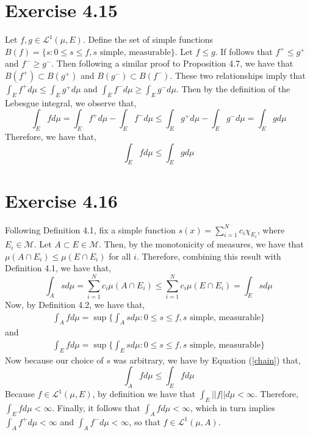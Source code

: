 \documentclass{article}
\begin{document}
  \section*{Exercise 4.15}
  Let $f,g \in \mathscr{L}^1(\mu,E)$. Define the set of simple functions $B(f) = \{ s : 0 \leq s \leq f, s \text{ simple, measurable}  \}$. Let $f \leq g$. If follows that $f^+ \leq g^+$ and $f^- \geq g^-$. Then following a similar proof to Proposition 4.7, we have that $B(f^+) \subset B(g^+)$ and $B(g^-) \subset B(f^-)$.
  These two relationships imply that $ \int_E f^+ d\mu \leq \int_E g^+ d\mu$ and $\int_E f^- d\mu \geq \int_E g^- d\mu$. Then by the definition of the Lebesgue integral, we observe that,
  \begin{equation}
  	\int_E fd\mu = \int_E f^+ d\mu - \int_E f^- d\mu \leq \int_E g^+ d\mu - \int_E g^- d\mu = \int_E g d\mu
  \end{equation}
  Therefore, we have that,
  \begin{equation}
  	\int_E fd\mu \leq \int_E g d\mu
  \end{equation}



  \section*{Exercise 4.16}
  Following Definition 4.1, fix a simple function $s(x) = \sum_{i=1}^{N} c_i \chi_{E_{i}}$, where $E_i \in \mathcal{M}$. Let $A \subset E \in \mathcal{M}$. Then, by the monotonicity of measures, we have that $\mu(A \cap E_i) \leq \mu(E \cap E_i)$ for all $i$. Therefore, combining this result with Definition 4.1, we have that,
  \begin{equation} \label{chain}
  	\int_A  sd\mu = \sum_{i=1}^{N} c_i \mu(A \cap E_i) \leq \sum_{i=1}^{N} c_i \mu(E \cap E_i) = \int_E s d\mu
  \end{equation}
  Now, by Definition 4.2, we have that,
  \begin{align*}
  	\int_A f d\mu = \sup \{ \int_A s d\mu : 0 \leq s \leq f, s \text{ simple, measurable}  \}
  \end{align*}
  and
  \begin{align*}
  	\int_E f d\mu = \sup \{ \int_E s d\mu : 0 \leq s \leq f, s \text{ simple, measurable}  \}
  \end{align*}
  Now because our choice of $s$ was arbitrary, we have by Equation (\ref{chain}) that,
  \begin{equation}
   \int_A f d\mu \leq \int_E f d\mu
  \end{equation}
  Because $f \in \mathscr{L}^1(\mu, E)$, by definition we have that $\int_E ||f|| d\mu < \infty$. Therefore, $\int_E f d\mu <\infty$. Finally, it follows that $\int_A f d\mu < \infty$, which in turn implies $\int_A f^+ d\mu < \infty$ and $\int_A f^{-} d\mu < \infty$, so that $f \in \mathscr{L}^1 (\mu, A)$.
\end{document}

